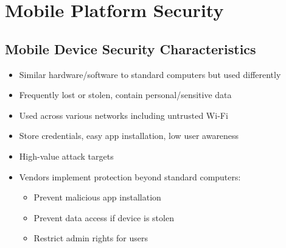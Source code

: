 \section{Mobile Platform Security}



\subsection{Mobile Device Security Characteristics}
{
\begin{itemize}[noitemsep]
  \item Similar hardware/software to standard computers but used differently
  \item Frequently lost or stolen, contain personal/sensitive data
  \item Used across various networks including untrusted Wi-Fi
  \item Store credentials, easy app installation, low user awareness
  \item High-value attack targets
  \item Vendors implement protection beyond standard computers:
  \begin{itemize}[noitemsep]
    \item Prevent malicious app installation
    \item Prevent data access if device is stolen
    \item Restrict admin rights for users
  \end{itemize}
  \end{itemize}
}


